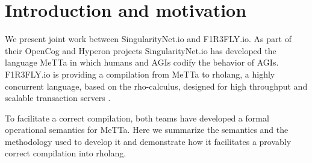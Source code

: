 \section{Introduction and motivation}
We present joint work between SingularityNet.io and F1R3FLY.io. As part of their OpenCog and Hyperon projects SingularityNet.io \cite{DBLP:conf/agi/HartG08} \cite{YT:GoertzelIklePotapovHyperon2022} has developed the language MeTTa in which humans and AGIs codify the behavior of AGIs. F1R3FLY.io is providing a compilation from MeTTa to rholang, a highly concurrent language, based on the rho-calculus, designed for high throughput and scalable transaction servers \cite{GH:MeredithRChainRholang} \cite{DBLP:journals/entcs/MeredithR05}.

To facilitate a correct compilation, both teams have developed a formal operational semantics for MeTTa. Here we summarize the semantics and the methodology used to develop it and demonstrate how it facilitates a provably correct compilation into rholang.

